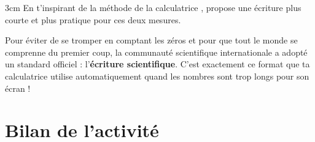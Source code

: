\documentclass[a4paper]{book}
\begin{document}
    \begin{ZoneReponse}{3cm}
        \quad En t'inspirant de la \og méthode de la calculatrice \fg{}, propose une écriture plus courte et plus pratique pour ces deux mesures.
    \end{ZoneReponse}
    
    \begin{cultureMaths}
        Pour éviter de se tromper en comptant les zéros et pour que tout le monde se comprenne du premier coup, la communauté scientifique internationale a adopté un standard officiel : l'\textbf{écriture scientifique}. C'est exactement ce format que ta calculatrice utilise automatiquement quand les nombres sont trop longs pour son écran !
    \end{cultureMaths}
    
    
\section{Bilan de l'activité}
    
\end{document}
